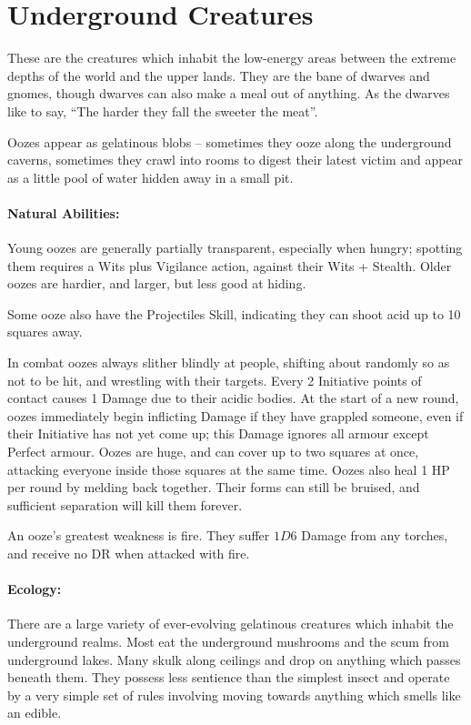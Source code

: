 \section{Underground Creatures}

\begin{multicols}{2}

\noindent
These are the creatures which inhabit the low-energy areas between the extreme depths of the world and the upper lands.
They are the bane of dwarves and gnomes, though dwarves can also make a meal out of anything.
As the dwarves like  to say, ``The harder they fall the sweeter the meat''.

\label{ooze}

Oozes appear as gelatinous blobs -- sometimes they ooze along the underground caverns, sometimes they crawl into rooms to digest their latest victim and appear as a little pool of water hidden away in a small pit.

\paragraph{Natural Abilities:} Young oozes are generally partially transparent, especially when hungry; spotting them requires a Wits plus Vigilance action, against their Wits + Stealth.
Older oozes are hardier, and larger, but less good at hiding.

Some ooze also have the Projectiles Skill, indicating they can shoot acid up to 10 squares away.

In combat oozes always slither blindly at people, shifting about randomly so as not to be hit, and wrestling with their targets.
Every 2 Initiative points of contact causes 1 Damage due to their acidic bodies.
At the start of a new round, oozes immediately begin inflicting Damage if they have grappled someone, even if their Initiative has not yet come up; this Damage ignores all armour except Perfect armour.
Oozes are huge, and can cover up to two squares at once, attacking everyone inside those squares at the same time.
Oozes also heal 1 HP per round by melding back together.
Their forms can still be bruised, and sufficient separation will kill them forever.

An ooze's greatest weakness is fire.
They suffer $1D6$ Damage from any torches, and receive no DR when attacked with fire.

\paragraph{Ecology:} There are a large variety of ever-evolving gelatinous creatures which inhabit the underground realms.  Most eat the underground mushrooms and the scum from underground lakes.  Many skulk along ceilings and drop on anything which passes beneath them.  They possess less sentience than the simplest insect and operate by a very simple set of rules involving moving towards anything which smells like an edible.


\end{multicols}
